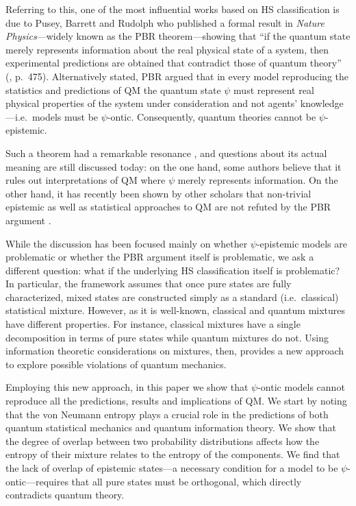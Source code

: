 \documentclass[10pt,twocolumn, nofootinbib]{revtex4-2}
\begin{document}
Referring to this, one of the most influential works based on HS classification is due to Pusey, Barrett and Rudolph who published a formal result in \emph{Nature Physics}---widely known as the PBR theorem---showing that ``if the quantum state merely represents information about the real physical state of a system, then experimental predictions are obtained that contradict those of quantum theory'' (\cite{PBR:2012}, p.\ 475). Alternatively stated, PBR argued that in every model reproducing the statistics and predictions of QM the quantum state $\psi$ must represent real physical properties of the system under consideration and not agents' knowledge---i.e.\ models must be $\psi$-ontic. Consequently, quantum theories cannot be $\psi$-epistemic. 

Such a theorem had a remarkable resonance \cite{Leifer:2014, Leifer:2014b, Lewis:2012, Renner:2012, Colbeck:2017, Hardy:2013, Maroney:2014, Patra:2013, Mansfield:2016, Schlosshauer:2012, Schlosshauer:2013, Schlosshauer:2014, Aaronson:2013}, and questions about its actual meaning are still discussed today: on the one hand, some authors believe that it rules out interpretations of QM where $\psi$ merely represents information. On the other hand, it has recently been shown by other scholars that non-trivial epistemic as well as statistical approaches to QM are not refuted by the PBR argument \cite{Ben:2017, Rizzi:2018, Oldofredi:2020b, Oldofredi:2021, DeBrota:2019}.

While the discussion has been focused mainly on whether $\psi$-epistemic models are problematic or whether the PBR argument itself is problematic, we ask a different question: what if the underlying HS classification itself is problematic? In particular, the framework assumes that once pure states are fully characterized, mixed states are constructed simply as a standard (i.e.\ classical) statistical mixture. However, as it is well-known, classical and quantum mixtures have different properties. For instance, classical mixtures have a single decomposition in terms of pure states while quantum mixtures do not. Using information theoretic considerations on mixtures, then, provides a new approach to explore possible violations of quantum mechanics.

Employing this new approach, in this paper we show that $\psi$-ontic models cannot reproduce all the predictions, results and implications of QM. We start by noting that the von Neumann entropy plays a crucial role in the predictions of both quantum statistical mechanics and quantum information theory. We show that the degree of overlap between two probability distributions affects how the entropy of their mixture relates to the entropy of the components. We find that the lack of overlap of epistemic states---a necessary condition for a model to be $\psi$-ontic---requires that all pure states must be orthogonal, which directly contradicts quantum theory.
\end{document}

